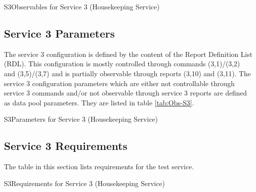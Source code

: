 \documentclass[a4paper,10pt]{article}
\newenvironment{cr_req}[2]
{
\begin{longtable}{|l|p{11.8cm}|}
\caption{#2}\label{tab:Req-#1} \\
\hline
\rowcolor{light-gray}
\textbf{Req. ID} & \textbf{Requirement Text}\\
\hline\hline
\endfirsthead
\rowcolor{light-gray}
\textbf{Req. ID} & \textbf{Requirement Text}\\
\hline\hline
\endhead
\DTLforeach*[\DTLiseq{\cat}{#1}]{dbReq}{\cat=Category,\type=Type,\id=Id,\reqText=Text}
{\DTLiffirstrow{}{\\\hline}P-\cat-\id/\type & \textit{\reqText}}\\\hline
}
{\end{longtable}}
\newenvironment{cr_obs}[2]
{
\begin{longtable}{|l|p{9.5cm}|}
\caption{#2}\label{tab:Obs-#1} \\
\hline
\rowcolor{light-gray}
\textbf{Name} & \textbf{Description}\\
\hline\hline
\endfirsthead
\rowcolor{light-gray}
\textbf{Name} & \textbf{Description}\\
\hline\hline
\endhead
\DTLforeach*[\DTLiseq{\cat}{#1}]{dbObs}{\cat=Category,\name=Name,\desc=Desc}
{\DTLiffirstrow{}{\\\hline}\texttt{\name} & \desc}\\\hline
}
{\end{longtable}}
\newenvironment{cr_par}[2]
{
\begin{longtable}{|l|p{9.5cm}|}
\caption{#2}\label{tab:Par-#1} \\
\hline
\rowcolor{light-gray}
\textbf{Name} & \textbf{Description}\\
\hline\hline
\endfirsthead
\rowcolor{light-gray}
\textbf{Name} & \textbf{Description}\\
\hline\hline
\endhead
\DTLforeach*[\DTLiseq{\cat}{#1}]{dbPar}{\cat=Category,\name=Name,\desc=Desc}
{\DTLiffirstrow{}{\\\hline}\texttt{\name} & \desc}\\\hline
}
{\end{longtable}}
\begin{document}
\begin{cr_obs}{S3}{Observables for Service 3 (Housekeeping Service)}
\end{cr_obs}

\newpage
\subsection{Service 3 Parameters}\label{sec:serv3Par}
The service 3 configuration is defined by the content of the Report Definition List (RDL). This configuration is mostly controlled through commands (3,1)/(3,2) and (3,5)/(3,7) and is partially observable through reports (3,10) and (3,11). The service 3 configuration parameters which are either not controllable through service 3 commands and/or not observable through service 3 reports are defined as data pool parameters. They are listed in table \ref{tab:Obs-S3}.

\begin{cr_par}{S3}{Parameters for Service 3 (Housekeeping Service)}
\end{cr_par}

\subsection{Service 3 Requirements}
The table in this section lists requirements for the test service.

\begin{cr_req}{S3}{Requirements for Service 3 (Housekeeping Service)}
\end{cr_req}
\end{document}
